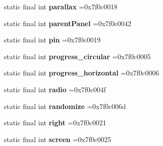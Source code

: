 \begin{DoxyCompactItemize}
\item 
\hypertarget{classcheck_1_1test_1_1_r_1_1id_afddd81c642a5abdfff02d3628e3af9a3}{}static final int {\bfseries parallax} =0x7f0c0018\label{classcheck_1_1test_1_1_r_1_1id_afddd81c642a5abdfff02d3628e3af9a3}

\item 
\hypertarget{classcheck_1_1test_1_1_r_1_1id_a8b5d1beeedf525a644165c9400dd4f6a}{}static final int {\bfseries parent\+Panel} =0x7f0c0042\label{classcheck_1_1test_1_1_r_1_1id_a8b5d1beeedf525a644165c9400dd4f6a}

\item 
\hypertarget{classcheck_1_1test_1_1_r_1_1id_a2626a27c5b1a35902534be25ae442940}{}static final int {\bfseries pin} =0x7f0c0019\label{classcheck_1_1test_1_1_r_1_1id_a2626a27c5b1a35902534be25ae442940}

\item 
\hypertarget{classcheck_1_1test_1_1_r_1_1id_aa511dff275f098da369213fbd508896e}{}static final int {\bfseries progress\+\_\+circular} =0x7f0c0005\label{classcheck_1_1test_1_1_r_1_1id_aa511dff275f098da369213fbd508896e}

\item 
\hypertarget{classcheck_1_1test_1_1_r_1_1id_aefb86c4a08d2691d793eee498e241d31}{}static final int {\bfseries progress\+\_\+horizontal} =0x7f0c0006\label{classcheck_1_1test_1_1_r_1_1id_aefb86c4a08d2691d793eee498e241d31}

\item 
\hypertarget{classcheck_1_1test_1_1_r_1_1id_a820fe6049a102cc029fd9ac8621a4492}{}static final int {\bfseries radio} =0x7f0c004f\label{classcheck_1_1test_1_1_r_1_1id_a820fe6049a102cc029fd9ac8621a4492}

\item 
\hypertarget{classcheck_1_1test_1_1_r_1_1id_ad8c21a9585844a9c5248147141ef1245}{}static final int {\bfseries randomize} =0x7f0c006d\label{classcheck_1_1test_1_1_r_1_1id_ad8c21a9585844a9c5248147141ef1245}

\item 
\hypertarget{classcheck_1_1test_1_1_r_1_1id_a7c9ffb76d82d7711d0fd9fbf2568d74a}{}static final int {\bfseries right} =0x7f0c0021\label{classcheck_1_1test_1_1_r_1_1id_a7c9ffb76d82d7711d0fd9fbf2568d74a}

\item 
\hypertarget{classcheck_1_1test_1_1_r_1_1id_a1e2042b2501a69a60172ea59493bd21b}{}static final int {\bfseries screen} =0x7f0c0025\label{classcheck_1_1test_1_1_r_1_1id_a1e2042b2501a69a60172ea59493bd21b}


\end{DoxyCompactItemize}
